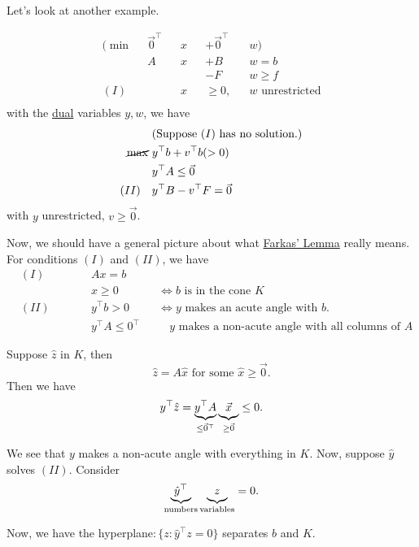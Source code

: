 Let's look at another example.

\begin{eg}
	\[
		\begin{alignedat}{4}
			(\min~   & \vec{0}^{\top} &&x &&+ \vec{0}^{\top} &&w)            \\
			& A&&x &&+ B&&w = b    \\
			& && &&-F&&w \geq f \\
			(I)\quad & &&x&&\geq  0, &&w\text{ unrestricted}          \\
		\end{alignedat}
	\]
	with the \hyperref[def:dual]{dual} variables \(y, w\), we have
	\begin{align*}
		               & (\text{Suppose \((I)\) has no solution.}) \\
		\cancel{\max}~ & y^{\top} b + v^{\top} b (>0)              \\
		               & y^{\top} A \leq \vec{0}                   \\
		(II)\quad      & y^{\top} B - v^{\top} F = \vec{0}
	\end{align*}
	with \(y\) unrestricted, \(v\geq  \vec{0}\).
\end{eg}

Now, we should have a general picture about what \hyperref[lma:Farkas-lemma]{Farkas' Lemma} really means. For conditions \((I)\) and \((II)\), we have
\[
	\begin{alignedat}{3}
		& (I) \qquad&& Ax = b       \\
		&      && x\geq 0    && \iff b \text{ is in the cone }K \\
		& (II) \qquad&& y^{\top}b> 0 &&\iff y \text{ makes an acute angle with }b.\\
		&      && y^{\top}A\leq 0^{\top}&&\quad y\text{ makes a non-acute angle with all columns of }A
	\end{alignedat}
\]

Suppose \(\hat{z}\) in \(K\), then
\[
	\hat{z} = A \hat{x} \text{ for some }\hat{x} \geq  \vec{0}.
\]
Then we have
\[
	y^{\top} \hat{z} = \underbrace{y^{\top} A}_{\leq\vec{0}^{\top}} \underbrace{\vphantom{y}\vec{x}}_{\geq  \vec{0}}  \leq 0.
\]

We see that \(y\) makes a non-acute angle with everything in \(K\). Now, suppose \(\hat{y}\) solves \((II)\). Consider
\[
	\underbrace{\hat{y}^{\top}}_{\text{numbers}} \underbrace{\vphantom{y}z}_{\text{variables}} = 0.
\]

Now, we have the hyperplane\(\colon\)\(\{z\colon \hat{y} ^{\top} z = 0\}\) separates \(b\) and \(K\).

